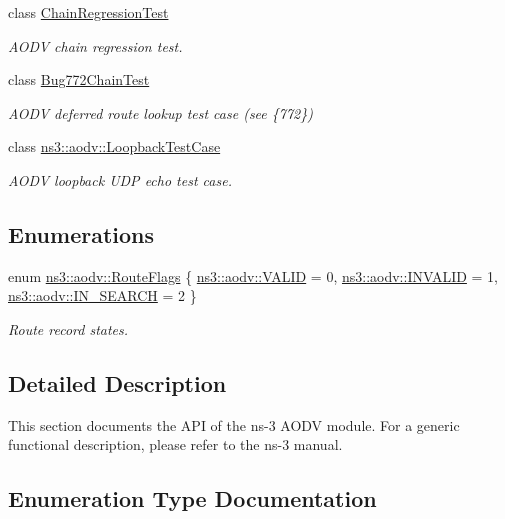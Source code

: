 \begin{DoxyCompactItemize}
class \hyperlink{classChainRegressionTest}{Chain\+Regression\+Test}
\begin{DoxyCompactList}\small\item\em A\+O\+DV chain regression test. \end{DoxyCompactList}\item 
class \hyperlink{classBug772ChainTest}{Bug772\+Chain\+Test}
\begin{DoxyCompactList}\small\item\em A\+O\+DV deferred route lookup test case (see \{772\}) \end{DoxyCompactList}\item 
class \hyperlink{classns3_1_1aodv_1_1LoopbackTestCase}{ns3\+::aodv\+::\+Loopback\+Test\+Case}
\begin{DoxyCompactList}\small\item\em A\+O\+DV loopback U\+DP echo test case. \end{DoxyCompactList}\end{DoxyCompactItemize}
\subsection*{Enumerations}
\begin{DoxyCompactItemize}
\item 
enum \hyperlink{group__aodv_ga44216921a9c725a5ab8bc19059052a26}{ns3\+::aodv\+::\+Route\+Flags} \{ \hyperlink{group__aodv_gga44216921a9c725a5ab8bc19059052a26af5fecee96bb2650aa417994840b43c99}{ns3\+::aodv\+::\+V\+A\+L\+ID} = 0, 
\hyperlink{group__aodv_gga44216921a9c725a5ab8bc19059052a26a0d7b8118b2af9344a91683148f1261c3}{ns3\+::aodv\+::\+I\+N\+V\+A\+L\+ID} = 1, 
\hyperlink{group__aodv_gga44216921a9c725a5ab8bc19059052a26aba44cda5a5df371b6567f70d7d8311fa}{ns3\+::aodv\+::\+I\+N\+\_\+\+S\+E\+A\+R\+CH} = 2
 \}\begin{DoxyCompactList}\small\item\em Route record states. \end{DoxyCompactList}
\end{DoxyCompactItemize}


\subsection{Detailed Description}
This section documents the A\+PI of the ns-\/3 A\+O\+DV module. For a generic functional description, please refer to the ns-\/3 manual. 

\subsection{Enumeration Type Documentation}
